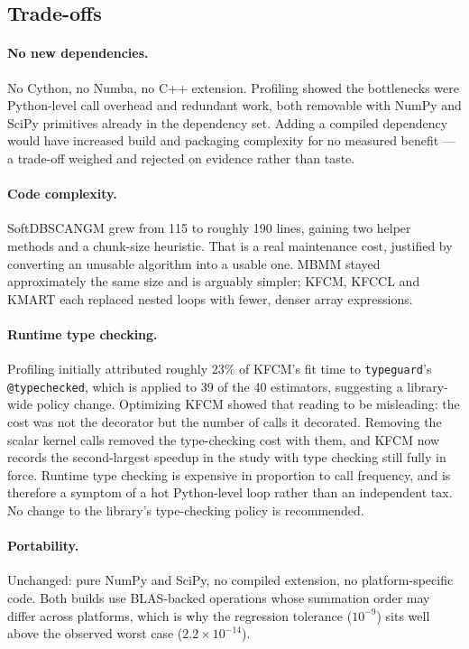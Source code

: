 

\subsection{Trade-offs}
\label{app:opt:tradeoffs}

\paragraph{No new dependencies.} No Cython, no Numba, no C++ extension.
Profiling showed the bottlenecks were Python-level call overhead and
redundant work, both removable with NumPy and SciPy primitives already in
the dependency set. Adding a compiled dependency would have increased
build and packaging complexity for no measured benefit --- a trade-off
weighed and rejected on evidence rather than taste.

\paragraph{Code complexity.} SoftDBSCANGM grew from 115 to roughly 190
lines, gaining two helper methods and a chunk-size heuristic. That is a
real maintenance cost, justified by converting an unusable algorithm into
a usable one. MBMM stayed approximately the same size and is arguably
simpler; KFCM, KFCCL and KMART each replaced nested loops with fewer,
denser array expressions.

\paragraph{Runtime type checking.} Profiling initially attributed roughly
$23\%$ of KFCM's fit time to \texttt{typeguard}'s \texttt{@typechecked},
which is applied to 39 of the 40 estimators, suggesting a library-wide
policy change. Optimizing KFCM showed that reading to be misleading: the
cost was not the decorator but the number of calls it decorated. Removing
the scalar kernel calls removed the type-checking cost with them, and
KFCM now records the second-largest speedup in the study with type
checking still fully in force. Runtime type checking is expensive in
proportion to call frequency, and is therefore a symptom of a hot
Python-level loop rather than an independent tax. No change to the
library's type-checking policy is recommended.

\paragraph{Portability.} Unchanged: pure NumPy and SciPy, no compiled
extension, no platform-specific code. Both builds use BLAS-backed
operations whose summation order may differ across platforms, which is
why the regression tolerance ($10^{-9}$) sits well above the observed
worst case ($2.2 \times 10^{-14}$).

